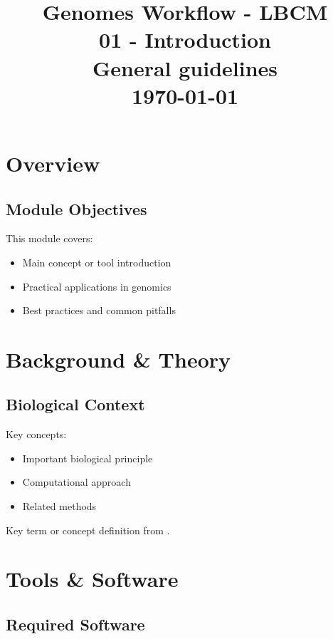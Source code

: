 \documentclass[a4paper,11pt]{article}
\title{
    \vfill
    \textcolor{noteblue}{\Huge Genomes Workflow - LBCM}\\
    \vspace{5.0cm}
    \textcolor{sidenotegray}{\huge 01 - Introduction}\\
    \vspace{1.5cm}
    \textcolor{sidenotegray}{\LARGE General guidelines}\\
    \vspace{5.0cm}
    \textcolor{sidenotegray}{\large \today}
    \vfill
}
\author{}
\date{}
\begin{document}
\maketitle
\thispagestyle{empty}
\newpage

\section{Overview}

\subsection{Module Objectives}

This module covers:
\begin{itemize}
    \item Main concept or tool introduction
    \item Practical applications in genomics
    \item Best practices and common pitfalls
\end{itemize}

\section{Background \& Theory}

\subsection{Biological Context}

Key concepts:
\begin{itemize}
    \item Important biological principle \cite{example2024}
    \item Computational approach \citep{author2024}
    \item Related methods \citet{smith2024}
\end{itemize}

\begin{definition}
Key term or concept definition from \cite{author2024}.
\end{definition}

\section{Tools \& Software}

\subsection{Required Software}
\end{document}
